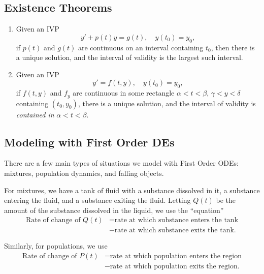 \documentclass[12pt]{article}
\theoremstyle{definition}
\begin{document}
\subsection{Existence Theorems}
\begin{enumerate}
	\item Given an IVP \begin{equation*}
		      y' + p(t)y = g(t), \hspace{1em} y(t_0) = y_0,
	      \end{equation*}
	      if $p(t)$ and $g(t)$ are continuous on an interval containing $t_0$, then there is a unique solution, and the interval of validity is the largest such interval.
	\item Given an IVP \begin{equation*}
		      y' = f(t, y), \hspace{1em} y(t_0) = y_0,
	      \end{equation*}
	      if $f(t, y)$ and $f_y$ are continuous in some rectangle $\alpha < t < \beta$, $\gamma < y < \delta$ containing $(t_0, y_0)$, there is a unique solution, and the interval of validity is \textit{contained in} $\alpha < t < \beta$.
\end{enumerate}

\subsection{Modeling with First Order DEs}
There are a few main types of situations we model with First Order ODEs: mixtures, population dynamics, and falling objects.

For mixtures, we have a tank of fluid with a substance dissolved in it, a substance entering the fluid, and a substance exiting the fluid.
Letting $Q(t)$ be the amount of the substance dissolved in the liquid, we use the ``equation'' \begin{align*}
	\text{Rate of change of $Q(t)$} & = \text{rate at which substance enters the tank} \\
	                                & - \text{rate at which substance exits the tank.}
\end{align*}

Similarly, for populations, we use \begin{align*}
	\text{Rate of change of $P(t)$} & = \text{rate at which population enters the region} \\
	                                & - \text{rate at which population exits the region.}
\end{align*}
\end{document}
